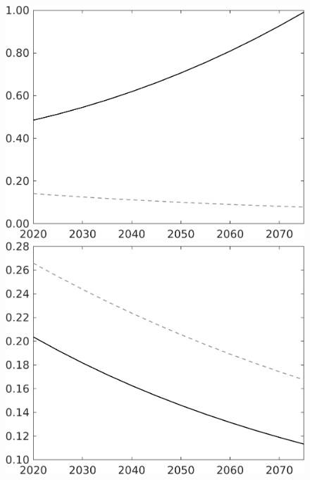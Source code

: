 \documentclass[12pt]{article}
\begin{document}
\begin{figure}
\begin{minipage}[]{0.32\textwidth}
	\end{minipage}
	\begin{minipage}[]{0.32\textwidth}
		\includegraphics[width=1\textwidth]{../../codding_model/own_basedOnFried/optimalPol_010922_revision/figures/all_13Sept22/LevTaufNoTauf_TaulCalib_regime0_LgLf_spillover0_nsk0_xgr0_knspil1_sep1_LFlimit0_emsbase0_countec0_GovRev0_etaa0.79_lgd0.png}
	\end{minipage}
	\begin{minipage}[]{0.32\textwidth}
		\includegraphics[width=1\textwidth]{../../codding_model/own_basedOnFried/optimalPol_010922_revision/figures/all_13Sept22/LevTaufNoTauf_TaulCalib_regime0_sff_spillover0_nsk0_xgr0_knspil1_sep1_LFlimit0_emsbase0_countec0_GovRev0_etaa0.79_lgd0.png}

\end{minipage}
\end{figure}
\end{document}
